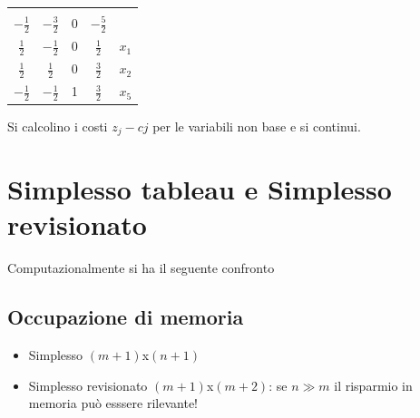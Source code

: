 \begin{table}[!h]
	\centering
	\def\arraystretch{2}
	\begin{tabular}{|ccc|c|c}
		\multicolumn{1}{c}{} & & \multicolumn{1}{c}{} & \multicolumn{1}{c}{} & \\ \cline{1-4}
		$-\frac{1}{2}$ & $-\frac{3}{2}$ & 0 & $-\frac{5}{2}$ & \\ \cline{1-4}
		$\frac{1}{2}$  & $-\frac{1}{2}$ & 0 & $\frac{1}{2}$ & $x_{1}$ \\
		$\frac{1}{2}$  & $\frac{1}{2}$ & 0 & $\frac{3}{2}$ & $x_{2}$ \\
		$-\frac{1}{2}$ & $-\frac{1}{2}$ & 1 & $\frac{3}{2}$ & $x_{5}$ \\ \cline{1-4}
	\end{tabular}
\end{table}
Si calcolino i costi $z_{j}-c{j}$ per le variabili non base e si continui.

\clearpage
\section{Simplesso tableau e Simplesso revisionato}
Computazionalmente si ha il seguente confronto

\subsection{Occupazione di memoria}
\begin{itemize}
	\item Simplesso $(m+1)$x$(n+1)$
	\item Simplesso revisionato $(m+1)$x$(m+2)$: se $n\gg m$ il risparmio in memoria può esssere rilevante!
\end{itemize}

